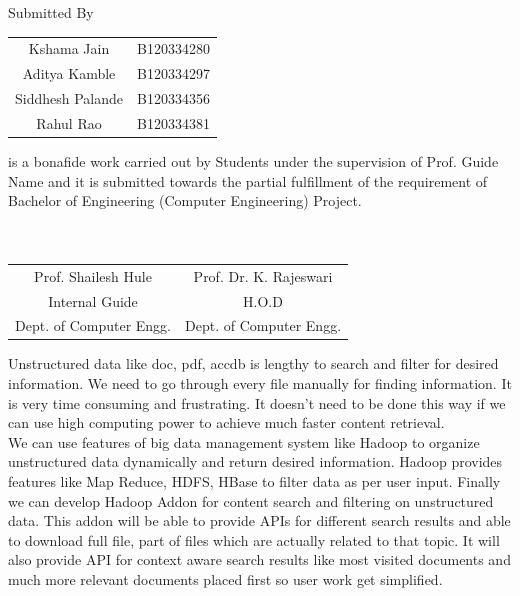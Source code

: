 \documentclass[oneside,a4paper,12pt]{report}
\begin{document}
\begin{center}
Submitted By \\[4ex]
\begin{tabular}{cc}
Kshama Jain & B120334280 \\
Aditya Kamble & B120334297 \\
Siddhesh Palande & B120334356 \\
Rahul Rao & B120334381 \\[4ex]
\end{tabular}
\end{center}


is a bonafide work carried out by Students under the supervision of Prof. Guide Name and it
is submitted towards the partial fulfillment of the requirement of Bachelor of Engineering (Computer Engineering) Project.\\\\\\

\bgroup
\def\arraystretch{0.7}
\begin{tabular}{c c }
Prof. Shailesh Hule &  \hspace{50 mm} Prof. Dr. K. Rajeswari \\								
Internal Guide   &  \hspace{50 mm} H.O.D \\
Dept. of Computer Engg.  &	\hspace{50 mm}Dept. of Computer Engg.  \\
\end{tabular}



\newpage

\setcounter{page}{0}
\frontmatter
{}
\rfoot{\thepage}

		
{   \setlength{\parindent}{11mm} }
{ \setlength{\parindent}{0mm} }
Unstructured data like doc, pdf, accdb is lengthy to search and filter for desired information. We need to go through every file manually for finding information. It is very time consuming and frustrating. It doesn’t need to be done this way if we can use high computing power to achieve much faster content retrieval. \\

We can use features of big data management system like Hadoop to organize unstructured data dynamically and return desired information. Hadoop provides features like Map Reduce, HDFS, HBase to filter data as per user input. Finally we can develop Hadoop Addon for content search and filtering on unstructured data. This addon will be able to provide APIs for different search results and able to download full file, part of files which are actually related to that topic. It will also provide API for context aware search results like most visited documents and much more relevant documents placed first so user work get simplified.  \\
\end{document}
